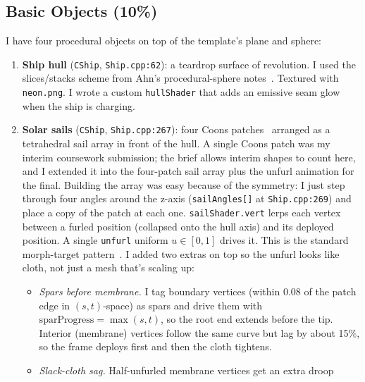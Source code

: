 \documentclass[11pt,a4paper]{article}
\begin{document}
\subsection{Basic Objects (10\%)}

I have four procedural objects on top of the template's plane and sphere:

\begin{enumerate}
  \item \textbf{Ship hull} (\texttt{CShip}, \texttt{Ship.cpp:62}): a
        teardrop surface of revolution. I used the slices/stacks scheme from
        Ahn's procedural-sphere notes~\cite{songho_sphere}. Textured with
        \texttt{neon.png}. I wrote a custom \texttt{hullShader} that adds an
        emissive seam glow when the ship is charging.
  \item \textbf{Solar sails} (\texttt{CShip}, \texttt{Ship.cpp:267}): four
        Coons patches~\cite{farin2002coons} arranged as a tetrahedral sail
        array in front of the hull. A single Coons patch was my interim
        coursework submission; the brief allows interim shapes to count
        here, and I extended it into the four-patch sail array plus the
        unfurl animation for the final. Building the array was easy
        because of the symmetry: I just step through four angles around
        the z-axis (\texttt{sailAngles[]} at \texttt{Ship.cpp:269}) and
        place a copy of the patch at each one.
        \texttt{sailShader.vert} lerps each vertex between a furled
        position (collapsed onto the hull axis) and its deployed position.
        A single \texttt{unfurl} uniform $u\in[0,1]$ drives it. This is the
        standard morph-target pattern~\cite{geeks3d_morphtarget}. I added
        two extras on top so the unfurl looks like cloth, not just a mesh
        that's scaling up:
        \begin{itemize}
          \item \emph{Spars before membrane.} I tag boundary vertices
                (within $0.08$ of the patch edge in $(s,t)$-space) as spars
                and drive them with $\mathrm{sparProgress} = \max(s,t)$, so
                the root end extends before the tip. Interior (membrane)
                vertices follow the same curve but lag by about 15\%, so
                the frame deploys first and then the cloth tightens.
          \item \emph{Slack-cloth sag.} Half-unfurled membrane vertices
                get an extra droop

\end{itemize}
\end{enumerate}
\end{document}
